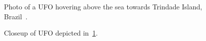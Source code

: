 %
\begin{figure}[b]
\sidecaption
%
%
\caption{Photo of a UFO hovering above the sea towards Trindade Island, Brazil~\cite{Trinitate1958Jan}.}

\label{2023-UFO-part-History-photos-1958-tr-c}       %
\end{figure}

%
\begin{figure}[b]
\sidecaption
%
%
\caption{Closeup of UFO depicted in~\ref{2023-UFO-part-History-photos-1958-tr-c}.}
\label{2023-UFO-part-History-photos-1958-tr-cu}       %
\end{figure}



\clearpage




